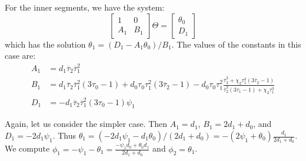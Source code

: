 \documentclass{article}
\begin{document}
For the inner segments, we have the system:
%
\[
  \begin{bmatrix}
  1 & 0 \\
  A_1 & B_1
  \end{bmatrix}
  \Theta = \begin{bmatrix}
  \theta_0 \\
  D_1
  \end{bmatrix}
\]
%
which has the solution \(\theta_1 = (D_1 - A_1 \theta_0)/B_1\).
The values of the constants in this case are:
%
\begin{align*}
A_1 &= d_1 \overline{\tau}_2 \overline{\tau}_1^2 \\
%
B_1 &= d_1 \overline{\tau}_2 \overline{\tau}_1^2 (3 \tau_0 - 1) + d_0 \tau_0 \tau_1^2(3 \overline{\tau}_2 - 1) - d_0 \tau_0 \tau_1^2 \frac{\overline{\tau}_2^3 + \chi_2 \tau_1^3 (3 \overline{\tau}_2 - 1)}{\overline{\tau}_2^3 (3 \tau_1 - 1) + \chi_2 \tau_1^3} \\
%
D_1 &= - d_1 \overline{\tau}_2 \overline{\tau}_1^2 (3 \tau_0 - 1) \psi_1
\end{align*}

Again, let us consider the simpler case.
Then \(A_1 = d_1\), \(B_1 = 2 d_1 + d_0\), and \(D_1 = - 2 d_1 \psi_1\).
Thus \(\theta_1 = (-2 d_1 \psi_1 - d_1 \theta_0)/(2 d_1 + d_0) = - (2 \psi_1 + \theta_0) \frac{d_1}{2 d_1 + d_0}\).
We compute \(\phi_1 = -\psi_1 - \theta_1 = \frac{- \psi_1 d_0 + \theta_0 d_1}{2 d_1 + d_0}\) and \(\phi_2 = \theta_1\).

\end{document}
